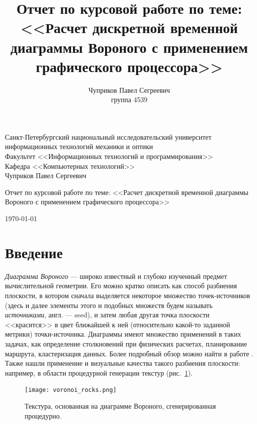 \documentclass[12pt]{article}
\author{Чуприков Павел Сегреевич \\ группа 4539\\}
\title{Отчет по курсовой работе по теме: <<Расчет дискретной временной диаграммы 
Вороного с применением графического процессора>>}
\begin{document}
\begin{titlepage}
\thispagestyle{empty}
\begin{center}
Санкт-Петербургский 
национальный исследовательский университет информационных технологий
механики и оптики\\
\smallskip
Факультет <<Информационных технологий и программирования>>\\
\smallskip
Кафедра <<Компьютерных технологий>>\\
\vspace{2cm}
\large{Чуприков Павел Сергеевич}\\
\vspace{1cm}
\begin{LARGE}
Отчет по курсовой работе по теме: <<Расчет дискретной временной диаграммы 
Вороного с применением графического процессора>>\\
\end{LARGE}
\vfill
\today
\end{center}
\end{titlepage}
\setcounter{page}{2}
\tableofcontents

\pagebreak

\section{Введение}
\emph{Диаграмма Вороного} --- широко известный и глубоко изученный предмет
вычислительной геометрии. Его можно кратко описать как способ разбиения
плоскости, в котором сначала выделяется некоторое множество точек-источников
(здесь и далее элементы этого и подобных множеств будем называть \emph{источниками},
англ. --- seed), и затем любая другая точка плоскости <<красится>> в цвет ближайшей к ней 
(относительно какой-то заданной метрики) точки-источника. 
Диаграммы имеют множество применений в таких
задачах, как определение столкновений при физических расчетах, 
планирование маршрута, кластеризация данных. Более подробный обзор 
можно найти в работе \cite{survey}. Также нашли применение и визуальные качества такого
разбиения плоскости: например, в области процедурной генерации текстур \cite{proced} (рис.~\ref{rocks}). 

\begin{figure}
\begin{center}
\texttt{[image: voronoi\_rocks.png]}
\end{center}
\caption{Текстура, основанная на диаграмме Вороного, сгенерированная процедурно.}
\label{rocks}
\end{figure}
\end{document}
